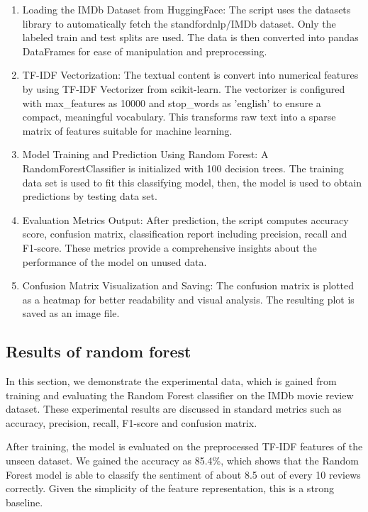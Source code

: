 \begin{enumerate}
    \item Loading the IMDb Dataset from HuggingFace: The script uses the datasets library to automatically fetch the standfordnlp/IMDb dataset. Only the labeled train and test splits are used. The data is then converted into pandas DataFrames for ease of manipulation and preprocessing.
    \item TF-IDF Vectorization: The textual content is convert into numerical features by using TF-IDF Vectorizer from scikit-learn. The vectorizer is configured with max\_features as 10000 and stop\_words as 'english' to ensure a compact, meaningful vocabulary. This transforms raw text into a sparse matrix of features suitable for machine learning.
    \item Model Training and Prediction Using Random Forest: A RandomForestClassifier is initialized with 100 decision trees. The training data set is used to fit this classifying model, then, the model is used to obtain predictions by testing data set.
    \item Evaluation Metrics Output: After prediction, the script computes accuracy score, confusion matrix, classification report including precision, recall and F1-score. These metrics provide a comprehensive insights about the performance of the model on unused data.
    \item Confusion Matrix Visualization and Saving: The confusion matrix is plotted as a heatmap for better readability and visual analysis. The resulting plot is saved as an image file.
\end{enumerate}


\subsection{Results of random forest}
In this section, we demonstrate the experimental data, which is gained from training and evaluating the Random Forest classifier on the IMDb movie review dataset. These experimental results are discussed in standard metrics such as accuracy, precision, recall, F1-score and confusion matrix.

After training, the model is evaluated on the preprocessed TF-IDF features of the unseen dataset. We gained the accuracy as 85.4\%, which shows that the Random Forest model is able to classify the sentiment of about 8.5 out of every 10 reviews correctly. Given the simplicity of the feature representation, this is a strong baseline.

